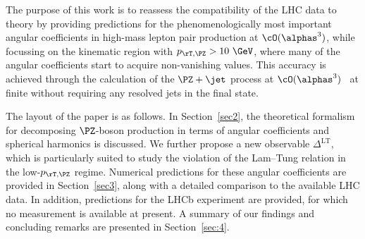 The purpose of this work is to reassess the compatibility of the LHC data
to theory by providing predictions for the phenomenologically most important angular coefficients 
in high-mass lepton pair production at $\cO(\alphas^3)$, while focussing on the kinematic region with $\ptz >10~\GeV$, 
where many of the angular coefficients start to acquire non-vanishing values. 
This accuracy is achieved through the calculation of the $\PZ+\jet$ process at 
$\cO(\alphas^3)$~\cite{Ridder:2015dxa} at finite \ptz without requiring any resolved jets in the final state.

The layout of the paper is as follows. In Section~\ref{sec2}, the theoretical formalism for 
decomposing $\PZ$-boson production in terms of angular coefficients and spherical
harmonics is discussed. 
We further propose a new observable $\Delta^\mathrm{LT}$, which is particularly suited to 
study the violation of the Lam--Tung relation in the low-$\ptz$ regime.
Numerical predictions for these angular coefficients are provided
in Section~\ref{sec3}, along with a detailed comparison to the available LHC data. In addition, 
predictions for the LHCb experiment are provided, for which no measurement is available at present.
%
A summary of our findings and concluding remarks are presented in Section~\ref{sec:4}.